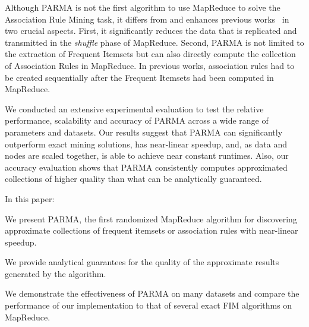 Although PARMA is not the first algorithm to use MapReduce to solve the
Association Rule Mining task, it differs from and enhances previous
works~\cite{CryansRC10,GhotingKPK11,Hammoud11,LiWZZC08,LiZ11,YangLF10,ZhouZCLF10}
in two crucial aspects. First, it significantly reduces the data that is
replicated and transmitted in the \emph{shuffle} phase of MapReduce.  Second,
PARMA is not limited to the extraction of Frequent Itemsets but can also
directly compute the collection of Association Rules in MapReduce. In previous
works, association rules had to be created sequentially after the Frequent
Itemsets had been computed in MapReduce. 

We conducted an extensive experimental evaluation to test the relative
performance, scalability and accuracy of PARMA across a wide range of
parameters and datasets. Our results suggest that PARMA can
significantly outperform exact mining solutions, has
near-linear speedup, and, as data and nodes are scaled together, is
able to achieve near constant runtimes. Also, our accuracy evaluation
shows that PARMA consistently computes approximated collections
of higher quality than what can be analytically guaranteed.

In this paper:
\begin{enumerate*}
\item We present PARMA, the first randomized MapReduce algorithm for discovering
  approximate collections of frequent itemsets or association rules with
  near-linear speedup.
\item We provide analytical guarantees for the quality of the approximate
  results generated by the algorithm.
\item We demonstrate the effectiveness of PARMA on many datasets and compare
  the performance of our implementation to that of several exact FIM algorithms
  on MapReduce.
\end{enumerate*}


